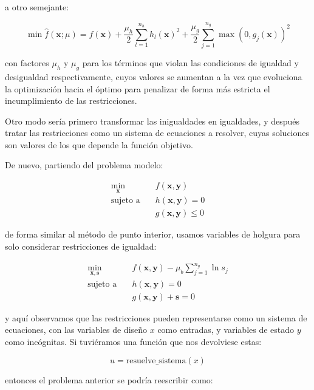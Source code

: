 a otro semejante:

\begin{equation}
	\min \hat{f}(\mathbf{x}; \mu) = f(\mathbf{x}) + \frac{\mu_h}{2} \sum_{l=1}^{n_h} h_l(\mathbf{x})^2 + \frac{\mu_g}{2} \sum_{j=1}^{n_g} \max(0, g_j(\mathbf{x}))^2
\end{equation}

con factores $\mu_h$ y $\mu_g$ para los términos que violan las condiciones de
igualdad y desigualdad respectivamente, cuyos valores se aumentan a la vez que
evoluciona la optimización hacia el óptimo para penalizar de forma más estricta
el incumplimiento de las restricciones.

Otro modo sería primero transformar las inigualdades en igualdades, y después
tratar las restricciones como un sistema de ecuaciones a resolver, cuyas
soluciones son valores de los que depende la función objetivo.

De nuevo, partiendo del problema modelo:

\begin{align}
	\min_{\mathbf{x}} \quad & f(\mathbf{x}, \mathbf{y})         \\
	\text{sujeto a} \quad   & h(\mathbf{x}, \mathbf{y}) = 0     \\
	                        & g(\mathbf{x}, \mathbf{y}) \leq  0
\end{align}

de forma similar al método de punto interior, usamos
variables de holgura para solo considerar restricciones
de igualdad:

\begin{align}
	\min_{\mathbf{x}, \mathbf{s}} \quad & f(\mathbf{x}, \mathbf{y}) - \mu_b \sum_{j=1}^{n_g} \ln s_j \\
	\text{sujeto a} \quad               & h(\mathbf{x}, \mathbf{y}) = 0                              \\
	                                    & g(\mathbf{x}, \mathbf{y}) + \mathbf{s} = 0
\end{align}

y aquí observamos que las restricciones pueden representarse como un sistema
de ecuaciones, con las variables de diseño $x$ como entradas, y variables
de estado $y$ como incógnitas. Si tuviéramos una función que nos devolviese
estas:

\begin{equation}
	u = \text{resuelve\_sistema}(x)
\end{equation}

entonces el problema anterior se podría reescribir como:

